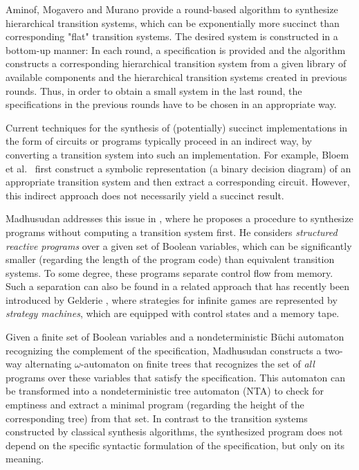 \documentclass[submission,copyright,creativecommons]{eptcs}
\begin{document}
Aminof, Mogavero and Murano \cite{aminof_synthesis_2012} provide a
round-based algorithm to synthesize hierarchical transition systems, which can be
exponentially more succinct than corresponding "flat" transition systems.
The desired system is constructed in a bottom-up manner:
In each round, a specification is provided and the algorithm constructs a
corresponding hierarchical transition system from a given library of available
components and the hierarchical
transition systems created in previous rounds.
Thus, in order to obtain a small system in the last
round, the specifications in the previous rounds have to be chosen in an
appropriate way.

Current techniques for the synthesis of (potentially) succinct implementations in the form
of circuits or programs typically proceed in an
indirect way, by converting a transition system into such an implementation.
For example, Bloem et al.\ \cite{Bloem20073}
first construct a symbolic representation (a binary decision diagram) of an
appropriate transition system and then extract a corresponding circuit.
However, this indirect approach does not necessarily yield a succinct result.

Madhusudan addresses this issue in \cite{madhusudan:LIPIcs:2011:3247}, where
he proposes a procedure to synthesize programs
without computing a transition system first. He considers
\emph{structured reactive programs} over a given set of Boolean variables,
which can be significantly smaller (regarding the length of the
program code) than equivalent transition systems.
To some degree, these programs separate control flow
from memory.
Such a separation can also be found in a related approach that has recently
been introduced by Gelderie \cite{Gelderie12}, where strategies for
infinite games are represented by \emph{strategy machines}, which are
equipped with control states and a memory tape.

Given a finite set of Boolean variables and a nondeterministic Büchi automaton
recognizing the complement of the specification,
Madhusudan constructs a two-way
alternating $\omega$-automaton on finite trees that recognizes the set of
\emph{all} programs over these variables that satisfy the specification.
This automaton can be transformed into a nondeterministic tree automaton (NTA)
to check for emptiness and extract a minimal program
(regarding the height of the corresponding tree) from that set.
In contrast to the transition systems constructed by classical synthesis
algorithms, the synthesized program does not depend on the specific syntactic
formulation of the specification, but only on its meaning.
\end{document}
